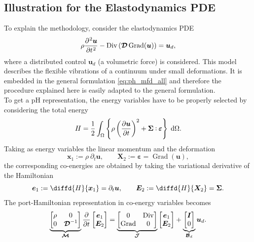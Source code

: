 \documentclass{svjour3}                     %
\DeclareMathOperator*{\Grad}{Grad}
\DeclareMathOperator*{\Div}{Div}
\def\onedot{$\mathsurround0pt\ldotp$}
\def\cddot{%
	\mathbin{\vcenter{\baselineskip.67ex
			\hbox{\onedot}\hbox{\onedot}}%
}}
\newcommand{\secondRev}[1]{\textcolor{blue!80!black}{#1}}
\begin{document}
\subsection{Illustration for the Elastodynamics PDE}
To explain the methodology, consider the elastodynamics PDE
\begin{equation*}
\rho \diffp[2]{\bm{u}}{t} - \Div\left(\bm{\mathcal{D}} \Grad(\bm{u})\right) = \bm{u}_d,
\end{equation*}
where a distributed control $\bm{u}_d$ (a volumetric force) is considered. This model describes the flexible vibrations of a continuum under small deformations. It is embedded in the general formulation \eqref{eq:ph_mfd_all} and therefore the procedure explained here is easily adapted to the general formulation. \\
To get a pH representation, the energy variables have to be properly selected by considering the total energy
\begin{equation}
\label{eq:en_eldyn}
\displaystyle H = \frac{1}{2} \int_{\Omega} \left\{\rho \left(\diffp{\bm{u}}{t}\right)^2 + \bm\Sigma \cddot \bm\varepsilon \right\} \d{\Omega}.
\end{equation}
\secondRev{
Taking as energy variables the linear momentum and the deformation
\begin{equation}
\bm{x}_1 := \rho \ \partial_t \bm{u}, \qquad \bm{X}_2 := \bm\varepsilon = \Grad(\bm{u}), 
\end{equation}
the corresponding co-energies are obtained by taking the variational derivative of the Hamiltonian
\begin{equation}
\bm{e}_1 := \diffd{H}{\bm{x}_1} =  \partial_t \bm{u}, \qquad
\bm{E}_2 := \diffd{H}{\bm{X}_2} = \bm\Sigma.
\end{equation}
}
The port-Hamiltonian representation in co-energy variables becomes
\begin{equation*}
\underbrace{\begin{bmatrix}
	\rho & 0 \\ 0 & \bm{\mathcal{D}}^{-1} \\
	\end{bmatrix}}_{\bm{\mathcal{M}}}
\diffp{}{t}
\begin{bmatrix}
\bm{e}_1 \\ \bm{E}_2 \\
\end{bmatrix} = 
\underbrace{\begin{bmatrix}
	0 & \Div \\ \Grad & 0 \\
	\end{bmatrix}}_{\bm{\mathcal{J}}}
\begin{bmatrix}
\bm{e}_1 \\ \bm{E}_2 \\
\end{bmatrix} + 
\underbrace{\begin{bmatrix}
	\bm{I} \\ 0 \\
	\end{bmatrix}}_{\bm{\mathcal{B}}_d} \bm{u}_d.
\end{equation*}
\end{document}
